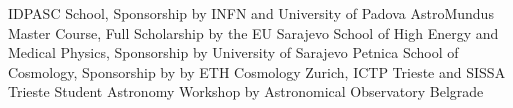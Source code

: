 %
%
%


\begin{scholarship}
					{IDPASC School, Sponsorship by INFN and University of Padova}
					{AstroMundus Master Course, Full Scholarship by the EU}
					{Sarajevo School of High Energy and Medical Physics, Sponsorship by University of Sarajevo}
					{Petnica School of Cosmology, Sponsorship by by ETH Cosmology Zurich, ICTP Trieste and SISSA Trieste}
					{Student Astronomy Workshop by Astronomical Observatory Belgrade}			
  \emptySeparator				
\end{scholarship}